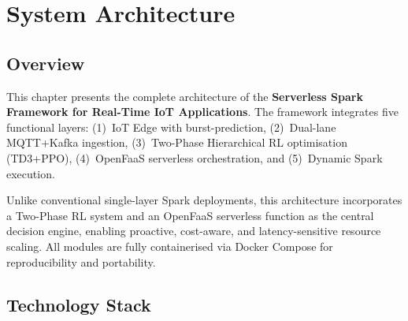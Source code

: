 \chapter{System Architecture}
\label{chap:architecture}

\section{Overview}
This chapter presents the complete architecture of the \textbf{Serverless Spark
Framework for Real-Time IoT Applications}. The framework integrates five functional
layers: (1)~IoT Edge with burst-prediction, (2)~Dual-lane MQTT+Kafka ingestion,
(3)~Two-Phase Hierarchical RL optimisation (TD3+PPO), (4)~OpenFaaS serverless
orchestration, and (5)~Dynamic Spark execution.

Unlike conventional single-layer Spark deployments, this architecture incorporates a
Two-Phase RL system and an OpenFaaS serverless function as the central decision engine,
enabling proactive, cost-aware, and latency-sensitive resource scaling. All modules are
fully containerised via Docker Compose for reproducibility and portability.

\section{Technology Stack}

